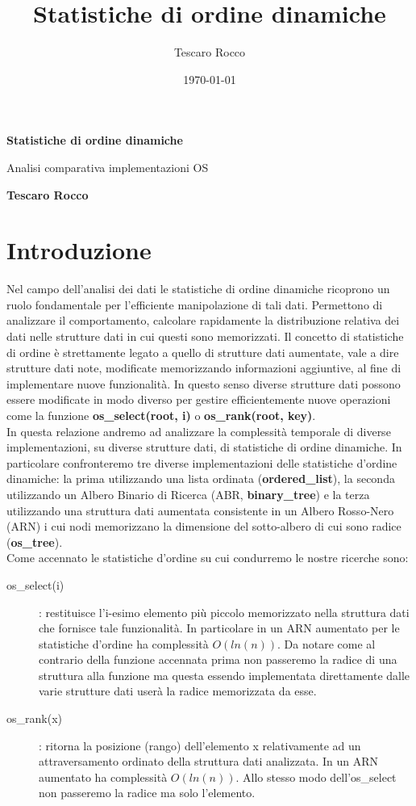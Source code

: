 \documentclass{article}
\title{Statistiche di ordine dinamiche}
\author{Tescaro Rocco}
\date{\today}
\begin{document}
\thispagestyle{plain}
\begin{center}
    \Large
    \textbf{Statistiche di ordine dinamiche}
    
    \vspace{0.2cm}
    \large
    Analisi comparativa implementazioni OS
    
    \vspace{0.4cm}
    \textbf{Tescaro Rocco}
    \vspace{0.2cm}
\end{center}

\section*{Introduzione}
\noindent Nel campo dell'analisi dei dati le statistiche di ordine dinamiche ricoprono un ruolo fondamentale per l'efficiente manipolazione di tali dati. Permettono di analizzare il comportamento, calcolare rapidamente la distribuzione relativa dei dati nelle strutture dati in cui questi sono memorizzati. Il concetto di statistiche di ordine è strettamente legato a quello di strutture dati aumentate, vale a dire strutture dati note, modificate memorizzando informazioni aggiuntive, al fine di implementare nuove funzionalità. In questo senso diverse strutture dati possono essere modificate in modo diverso per gestire efficientemente nuove operazioni come la funzione \textbf{os\_select(root, i)} o \textbf{os\_rank(root, key)}. \\

\noindent In questa relazione andremo ad analizzare la complessità temporale di diverse implementazioni, su diverse strutture dati, di statistiche di ordine dinamiche. In particolare confronteremo tre diverse implementazioni delle statistiche d'ordine dinamiche: la prima utilizzando una lista ordinata (\textbf{ordered\_list}), la seconda utilizzando un Albero Binario di Ricerca (ABR, \textbf{binary\_tree}) e la terza utilizzando una struttura dati aumentata consistente in un Albero Rosso-Nero (ARN) i cui nodi memorizzano la dimensione del sotto-albero di cui sono radice (\textbf{os\_tree}). \\

\noindent Come accennato le statistiche d'ordine su cui condurremo le nostre ricerche sono:
\begin{description}
    \item[os\_select(i)]: restituisce l'i-esimo elemento più piccolo memorizzato nella struttura dati che fornisce tale funzionalità. In particolare in un ARN aumentato per le statistiche d'ordine ha complessità $O(ln(n))$. Da notare come al contrario della funzione accennata prima non passeremo la radice di una struttura alla funzione ma questa essendo implementata direttamente dalle varie strutture dati userà la radice memorizzata da esse.
    \item[os\_rank(x)]: ritorna la posizione (rango) dell'elemento x relativamente ad un attraversamento ordinato della struttura dati analizzata. In un ARN aumentato ha complessità $O(ln(n))$. Allo stesso modo dell'os\_select non passeremo la radice ma solo l'elemento.
\end{description}
\end{document}
